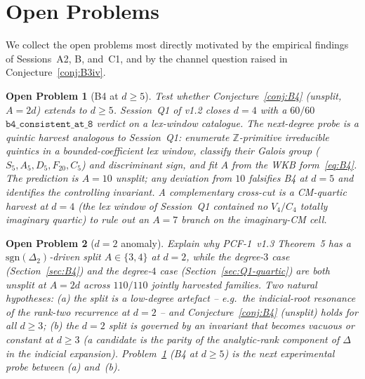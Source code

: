 \documentclass[11pt,a4paper]{article}
\newtheorem{problem}{Open Problem}
\theoremstyle{definition}
\theoremstyle{remark}
\newcommand{\Z}{\mathbb{Z}}
\begin{document}
\section{Open Problems}\label{sec:openproblems}

We collect the open problems most directly motivated by the
empirical findings of Sessions~A2, B, and~C1, and by the channel
question raised in Conjecture~\ref{conj:B3iv}.

\begin{problem}[B4 at $d\ge 5$]\label{op:b4-degree-d}
Test whether Conjecture~\ref{conj:B4} (unsplit, $A=2d$) extends to
$d\ge 5$. Session~Q1 of v1.2 closes $d=4$ with a $60/60$
$\mathtt{b4\_consistent\_at\_8}$ verdict on a lex-window catalogue.
The next-degree probe is a quintic harvest analogous to Session~Q1:
enumerate $\Z$-primitive irreducible quintics in a bounded-coefficient
lex window, classify their Galois group ($S_{5}, A_{5}, D_{5}, F_{20},
C_{5}$) and discriminant sign, and fit $A$ from the WKB
form~\eqref{eq:B4}. The prediction is $A=10$ unsplit; any deviation
from $10$ falsifies B4 at $d=5$ and identifies the controlling
invariant. A complementary cross-cut is a CM-quartic harvest at
$d=4$ (the lex window of Session~Q1 contained no $V_{4}/C_{4}$
totally imaginary quartic) to rule out an $A=7$ branch on the
imaginary-CM cell.
\end{problem}

\begin{problem}[$d=2$ anomaly]\label{op:d2-anomaly}
Explain why PCF-1~v1.3 Theorem~5 has a
$\mathrm{sgn}(\Delta_{2})$-driven split $A\in\{3,4\}$ at $d=2$, while
the degree-$3$ case (Section~\ref{sec:B4}) and the degree-$4$ case
(Section~\ref{sec:Q1-quartic}) are \emph{both unsplit} at $A=2d$
across $110/110$ jointly harvested families. Two natural hypotheses:
(a) the split is a low-degree artefact -- e.g.\ the indicial-root
resonance of the rank-two recurrence at $d=2$ -- and
Conjecture~\ref{conj:B4} (unsplit) holds for all $d\ge 3$;
(b) the $d=2$ split is governed by an invariant that becomes vacuous
or constant at $d\ge 3$ (a candidate is the parity of the
analytic-rank component of $\Delta$ in the indicial expansion).
Problem~\ref{op:b4-degree-d} (B4 at $d\ge 5$) is the next
experimental probe between (a) and~(b).
\end{problem}
\end{document}

